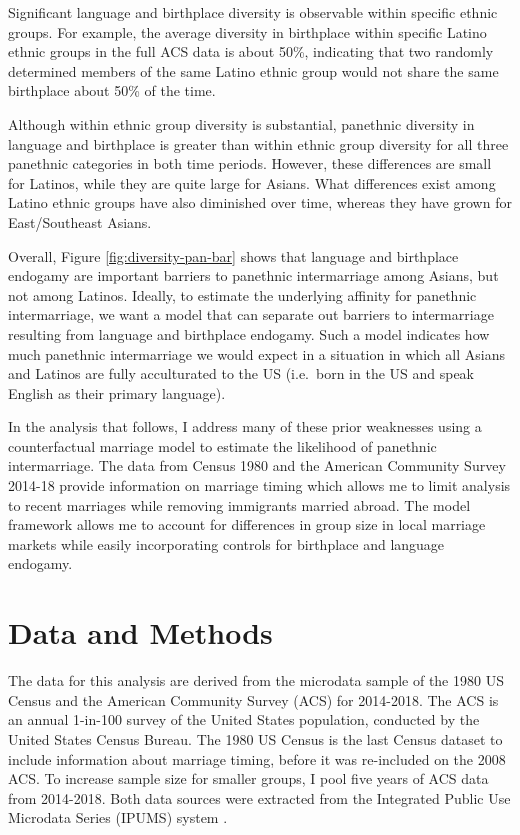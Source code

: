 \documentclass[11pt,]{article}
\begin{document}
Significant language and birthplace diversity is observable within specific ethnic groups. For example, the average diversity in birthplace within specific Latino ethnic groups in the full ACS data is about 50\%, indicating that two randomly determined members of the same Latino ethnic group would not share the same birthplace about 50\% of the time.

Although within ethnic group diversity is substantial, panethnic diversity in language and birthplace is greater than within ethnic group diversity for all three panethnic categories in both time periods. However, these differences are small for Latinos, while they are quite large for Asians. What differences exist among Latino ethnic groups have also diminished over time, whereas they have grown for East/Southeast Asians.

Overall, Figure \ref{fig:diversity-pan-bar} shows that language and birthplace endogamy are important barriers to panethnic intermarriage among Asians, but not among Latinos. Ideally, to estimate the underlying affinity for panethnic intermarriage, we want a model that can separate out barriers to intermarriage resulting from language and birthplace endogamy. Such a model indicates how much panethnic intermarriage we would expect in a situation in which all Asians and Latinos are fully acculturated to the US (i.e.~born in the US and speak English as their primary language).

In the analysis that follows, I address many of these prior weaknesses using a counterfactual marriage model to estimate the likelihood of panethnic intermarriage. The data from Census 1980 and the American Community Survey 2014-18 provide information on marriage timing which allows me to limit analysis to recent marriages while removing immigrants married abroad. The model framework allows me to account for differences in group size in local marriage markets while easily incorporating controls for birthplace and language endogamy.

\hypertarget{data-and-methods}{%
\section{Data and Methods}\label{data-and-methods}}

The data for this analysis are derived from the microdata sample of the 1980 US Census and the American Community Survey (ACS) for 2014-2018. The ACS is an annual 1-in-100 survey of the United States population, conducted by the United States Census Bureau. The 1980 US Census is the last Census dataset to include information about marriage timing, before it was re-included on the 2008 ACS. To increase sample size for smaller groups, I pool five years of ACS data from 2014-2018. Both data sources were extracted from the Integrated Public Use Microdata Series (IPUMS) system \citep{ruggles_ipums_2020}.
\end{document}
